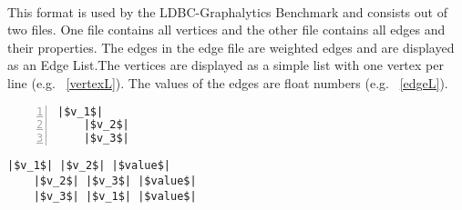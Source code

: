 \newpage
{}\\
This format is used by the LDBC-Graphalytics Benchmark and consists out of two files. One file contains all vertices and the other file contains all edges and their properties. The edges in the edge file are weighted edges and are displayed as an Edge List.The vertices are displayed as a simple list with one vertex per line (e.g. ~\ref{vertexL}). The values of the edges are float numbers (e.g. ~\ref{edgeL}).\cite{LDBC-Graphalytics.10}\\
\noindent\begin{minipage}{.48\textwidth}
	\begin{lstlisting}[numbers=left,
	stepnumber=1,showlines=true,caption={Vertex-List},captionpos=b, linewidth={\textwidth}, escapeinside=||,gobble = 4,label={vertexL}]
	|$v_1$|
	|$v_2$|
	|$v_3$|
	\end{lstlisting}
\end{minipage}\hfill
\begin{minipage}{.48\textwidth}
	\begin{lstlisting}[numbers=none,caption={Edge-List with Properties},captionpos=b, linewidth={\textwidth}, escapeinside=||,gobble = 4,label={edgeL}]
	|$v_1$| |$v_2$| |$value$|
	|$v_2$| |$v_3$| |$value$|
	|$v_3$| |$v_1$| |$value$|
	\end{lstlisting}
\end{minipage}

